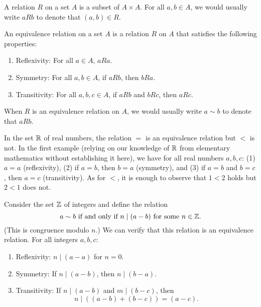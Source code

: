 \begin{definition}[Relation]
    A relation \(R\) on a set \(A\) is a subset of \(A \times A\). For all \(a,
    b \in A\), we would usually write \(a R b\) to denote that \((a, b) \in R\).
\end{definition}

\begin{definition}
    An equivalence relation on a set \(A\) is a relation \(R\) on \(A\) that
    satisfies the following properties:
    \begin{enumerate}[label=(\alph*)]
        \item Reflexivity: For all \(a \in A\), \(a R a\).
        \item Symmetry: For all \(a, b \in A\), if \(a R b\), then \(b R a\).
        \item Transitivity: For all \(a, b, c \in A\), if \(a R b\) and \(b R
        c\), then \(a R c\).
    \end{enumerate}

    When \(R\) is an equivalence relation on \(A\), we would usually write \(a
    \sim b\) to denote that \(a R b\).
\end{definition}

\begin{example}
    In the set \(\mathbb{R}\) of real numbers, the relation \(=\) is an equivalence
    relation but \(<\) is not. In the first example (relying on our knowledge of
    \(\mathbb{R}\) from elementary mathematics without establishing it here), we have
    for all real numbers \(a, b, c\): (1) \(a = a\) (reflexivity), (2) if \(a =
    b\), then \(b = a\) (symmetry), and (3) if \(a = b\) and \(b = c\), then \(a
    = c\) (transitivity). As for \(<\), it is enough to observe that \(1 < 2\)
    holds but \(2 < 1\) does not.
\end{example}

\begin{example}
    Consider the set \(\mathbb{Z}\) of integers and define the relation
    \[
        a \sim b \text{ if and only if } n \mid (a - b) \text{ for some } n \in \mathbb{Z}.
    \]
    (This is congruence modulo \(n\).) We can verify that this relation is an
    equivalence relation. For all integers \(a, b, c\):
    \begin{enumerate}[label=(\alph*), itemsep=0pt, wide]
        \item Reflexivity: \(n \mid (a - a)\) for \(n = 0\).
        \item Symmetry: If \(n \mid (a - b)\), then \(n \mid (b - a)\).
        \item Transitivity: If \(n \mid (a - b)\) and \(m \mid (b - c)\), then
        \[n \mid ((a - b) + (b - c)) = (a - c).\]
    \end{enumerate}
\end{example}

